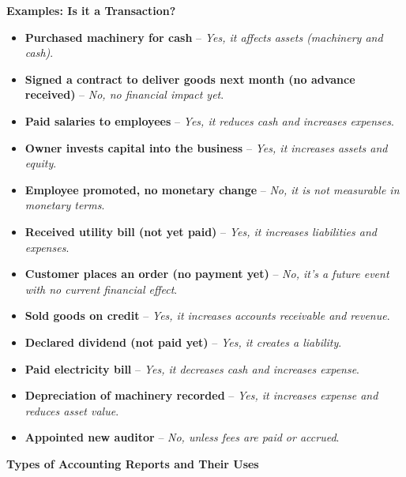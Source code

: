 \documentclass[12pt,a4paper]{book}
\begin{document}
\textbf{Examples: Is it a Transaction?}
\begin{itemize}
    \item \textbf{Purchased machinery for cash} – \textit{Yes, it affects assets (machinery and cash)}.
    \item \textbf{Signed a contract to deliver goods next month (no advance received)} – \textit{No, no financial impact yet}.
    \item \textbf{Paid salaries to employees} – \textit{Yes, it reduces cash and increases expenses}.
    \item \textbf{Owner invests capital into the business} – \textit{Yes, it increases assets and equity}.
    \item \textbf{Employee promoted, no monetary change} – \textit{No, it is not measurable in monetary terms}.
    \item \textbf{Received utility bill (not yet paid)} – \textit{Yes, it increases liabilities and expenses}.
    \item \textbf{Customer places an order (no payment yet)} – \textit{No, it's a future event with no current financial effect}.
    \item \textbf{Sold goods on credit} – \textit{Yes, it increases accounts receivable and revenue}.
    \item \textbf{Declared dividend (not paid yet)} – \textit{Yes, it creates a liability}.
    \item \textbf{Paid electricity bill} – \textit{Yes, it decreases cash and increases expense}.
    \item \textbf{Depreciation of machinery recorded} – \textit{Yes, it increases expense and reduces asset value}.
    \item \textbf{Appointed new auditor} – \textit{No, unless fees are paid or accrued}.
\end{itemize}

\vspace{0.5cm}

\textbf{Types of Accounting Reports and Their Uses}
\end{document}
